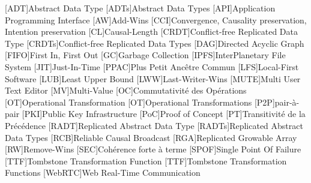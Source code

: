 [ADT]{Abstract Data Type}
[ADTs]{Abstract Data Types}
[API]{Application Programming Interface}
[AW]{Add-Wins}
[CCI]{Convergence, Causality preservation, Intention preservation}
[CL]{Causal-Length}
[CRDT]{Conflict-free Replicated Data Type}
[CRDTs]{Conflict-free Replicated Data Types}
[DAG]{Directed Acyclic Graph}
[FIFO]{First In, First Out}
[GC]{Garbage Collection}
[IPFS]{InterPlanetary File System}
[JIT]{Just-In-Time}
[PPAC]{Plus Petit Ancêtre Commun}
[LFS]{Local-First Software}
[LUB]{Least Upper Bound}
[LWW]{Last-Writer-Wins}
[MUTE]{Multi User Text Editor}
[MV]{Multi-Value}
[OC]{Commutativité des Opérations}
[OT]{Operational Transformation}
[OT]{Operational Transformations}
[P2P]{pair-à-pair}
[PKI]{Public Key Infrastructure}
[PoC]{Proof of Concept}
[PT]{Transitivité de la Précédence}
[RADT]{Replicated Abstract Data Type}
[RADTs]{Replicated Abstract Data Types}
[RCB]{Reliable Causal Broadcast}
[RGA]{Replicated Growable Array}
[RW]{Remove-Wins}
[SEC]{Cohérence forte à terme}
[SPOF]{Single Point Of Failure}
[TTF]{Tombstone Transformation Function}
[TTF]{Tombstone Transformation Functions}
[WebRTC]{Web Real-Time Communication}
